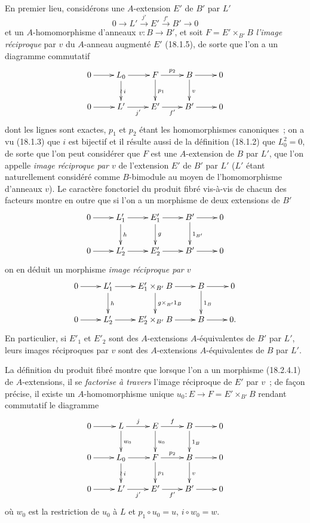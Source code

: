 \begin{env}[18.2.5]
\label{0.18.2.5-fr}
En premier lieu, considérons une $A$-extension $E'$ de $B'$ par $L'$
\[
  0\longrightarrow L'\xrightarrow{j'}E'\xrightarrow{f'}B'\longrightarrow0
\]
et un $A$-homomorphisme d'anneaux $v:B\to B'$, et soit
$F=E'\times_{B'}B$ \emph{l'image réciproque} par $v$ du $A$-anneau augmenté
$E'$ (18.1.5), de sorte que l'on a un diagramme commutatif
\[
  \xymatrix{
    0\ar[r] & L_0\ar[r]\ar[d]^i\ar@{}[d]|{\wr} & F\ar[r]^{p_2}\ar[d]^{p_1}
      & B\ar[r]\ar[d]^v & 0\\
    0\ar[r] & L'\ar[r]_{j'} & E'\ar[r]_{f'} & B'\ar[r] & 0
  }
\]
dont les lignes sont exactes, $p_1$ et $p_2$ étant les homomorphismes
canoniques~; on a vu (18.1.3) que $i$ est bijectif et il résulte aussi de la
définition (18.1.2) que $L_0^2=0$, de sorte que l'on peut considérer que $F$
est une $A$-extension de $B$ par $L'$, que l'on appelle \emph{image
réciproque par $v$} de l'extension $E'$ de $B'$ par $L'$ ($L'$ étant
naturellement considéré comme $B$-bimodule au moyen de l'homomorphisme
d'anneaux $v$). Le caractère fonctoriel
du produit fibré vis-à-vis de chacun des facteurs montre en outre que si l'on
a un morphisme de deux extensions de $B'$
\[
  \xymatrix{
    0\ar[r] & L'_1\ar[r]\ar[d]^h & E'_1\ar[r]\ar[d]^g
      & B'\ar[r]\ar[d]^{1_{B'}} & 0\\
    0\ar[r] & L'_2\ar[r] & E'_2\ar[r] & B'\ar[r] & 0
  }
\]
on en déduit un morphisme \emph{image réciproque par $v$}
\[
  \xymatrix{
    0\ar[r] & L'_1\ar[r]\ar[d]^h & E'_1\times_{B'}B\ar[r]
      \ar[d]^{g\times_{B'}1_B} & B\ar[r]\ar[d]^{1_B} & 0\\
    0\ar[r] & L'_2\ar[r] & E'_2\times_{B'}B\ar[r] & B\ar[r] & 0.
  }
\]
En particulier, si $E'_1$ et $E'_2$ sont des $A$-extensions
$A$-équivalentes de $B'$ par $L'$, leurs images réciproques par $v$ sont des
$A$-extensions $A$-équivalentes de $B$ par $L'$.

La définition du produit fibré montre que lorsque l'on a un morphisme
(18.2.4.1) de $A$-extensions, il se \emph{factorise à travers} l'image
réciproque de $E'$ par $v$~; de façon précise, il existe un
$A$-homomorphisme unique $u_0:E\to F=E'\times_{B'}B$ rendant commutatif le
diagramme
\[
  \xymatrix{
    0\ar[r] & L\ar[r]^j\ar[d]^{w_0} & E\ar[r]^f\ar[d]^{u_0}
      & B\ar[r]\ar[d]^{1_B} & 0\\
    0\ar[r] & L_0\ar[r]\ar[d]^i\ar@{}[d]|{\wr} & F\ar[r]^{p_2}\ar[d]^{p_1}
      & B\ar[r]\ar[d]^v & 0\\
    0\ar[r] & L'\ar[r]_{j'} & E'\ar[r]_{f'} & B'\ar[r] & 0
  }
\]
où $w_0$ est la restriction de $u_0$ à $L$ et
$p_1\circ u_0=u$, $i\circ w_0=w$.
\end{env}

